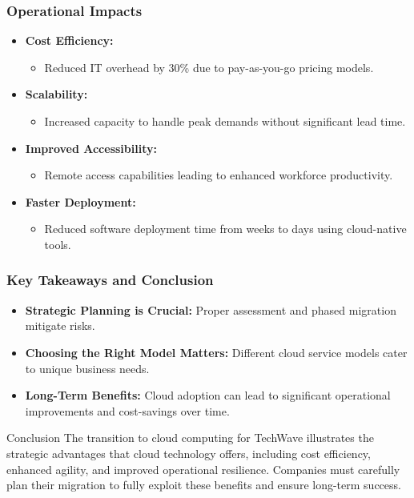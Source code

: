 \documentclass[aspectratio=169]{beamer}
\begin{document}
\begin{frame}[fragile]
    \frametitle{Operational Impacts}
    \begin{itemize}
        \item \textbf{Cost Efficiency:}
        \begin{itemize}
            \item Reduced IT overhead by 30\% due to pay-as-you-go pricing models.
        \end{itemize}
        \item \textbf{Scalability:}
        \begin{itemize}
            \item Increased capacity to handle peak demands without significant lead time.
        \end{itemize}
        \item \textbf{Improved Accessibility:}
        \begin{itemize}
            \item Remote access capabilities leading to enhanced workforce productivity.
        \end{itemize}
        \item \textbf{Faster Deployment:}
        \begin{itemize}
            \item Reduced software deployment time from weeks to days using cloud-native tools.
        \end{itemize}
    \end{itemize}
\end{frame}

\begin{frame}[fragile]
    \frametitle{Key Takeaways and Conclusion}
    \begin{itemize}
        \item \textbf{Strategic Planning is Crucial:} Proper assessment and phased migration mitigate risks.
        \item \textbf{Choosing the Right Model Matters:} Different cloud service models cater to unique business needs.
        \item \textbf{Long-Term Benefits:} Cloud adoption can lead to significant operational improvements and cost-savings over time.
    \end{itemize}
    
    \begin{block}{Conclusion}
        The transition to cloud computing for TechWave illustrates the strategic advantages that cloud technology offers, including cost efficiency, enhanced agility, and improved operational resilience. Companies must carefully plan their migration to fully exploit these benefits and ensure long-term success.
    \end{block}
\end{frame}
\end{document}
